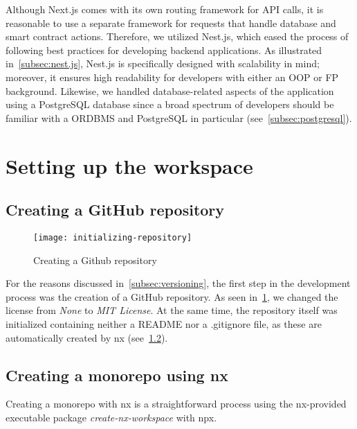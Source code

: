 Although Next.js comes with its own routing framework for API calls, it is reasonable to use a separate framework for requests that handle database and smart contract actions.
Therefore, we utilized Nest.js, which eased the process of following best practices for developing backend applications.
As illustrated in~\cref{subsec:nest.js}, Nest.js is specifically designed with scalability in mind;
moreover, it ensures high readability for developers with either an \gls{OOP} or \gls{FP} background.
Likewise, we handled database-related aspects of the application using a PostgreSQL database since a broad spectrum of developers should be familiar with a \gls{ORDBMS} and PostgreSQL in particular (see~\cref{subsec:postgresql}).

\section{Setting up the workspace}\label{sec:setting-up-the-workspace}

\subsection{Creating a GitHub repository}\label{subsec:creating-a-git-repository}

\begin{figure}[h]
    \centering
    \texttt{[image: initializing-repository]}
    \caption{Creating a Github repository}
    \label{fig:initializing-repository}
\end{figure}

For the reasons discussed in~\cref{subsec:versioning}, the first step in the development process was the creation of a GitHub repository.
As seen in~\cref{fig:initializing-repository}, we changed the license from \emph{None} to \emph{MIT License}.
At the same time, the repository itself was initialized containing neither a README nor a .gitignore file, as these are automatically created by nx (see~\cref{subsec:creating-a-monorepo-using-nx}).

\subsection{Creating a monorepo using nx}\label{subsec:creating-a-monorepo-using-nx}

Creating a monorepo with nx is a straightforward process using the nx-provided executable package \emph{create-nx-workspace} with \gls{npx}.

